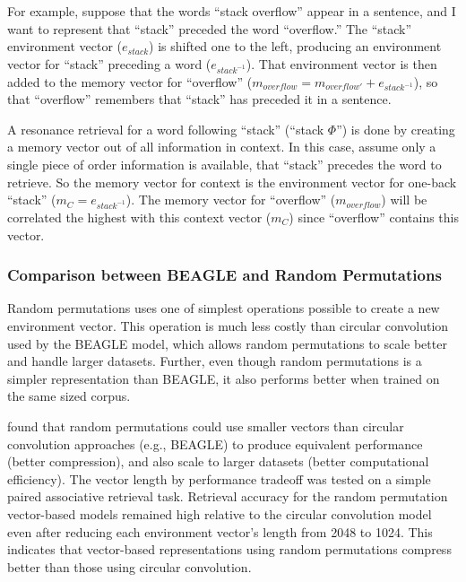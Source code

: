 \documentclass[man,floatsintext,donotrepeattitle]{apa6}
\begin{document}
For example, suppose that the words ``stack overflow'' appear in a sentence, and I want to represent that ``stack'' preceded the word ``overflow.''
The ``stack'' environment vector ($e_{stack}$) is shifted one to the left, producing an environment vector for ``stack'' preceding a word ($e_{stack^{-1}}$).
That environment vector is then added to the memory vector for ``overflow'' ($m_{overflow} = m_{overflow'} + e_{stack^{-1}}$), so that ``overflow'' remembers that ``stack'' has preceded it in a sentence.

A resonance retrieval for a word following ``stack'' (``stack $\Phi$'') is done by creating a memory vector out of all information in context.
In this case, assume only a single piece of order information is available, that ``stack'' precedes the word to retrieve.
So the memory vector for context is the environment vector for one-back ``stack'' ($m_{C} = e_{stack^{-1}}$).
The memory vector for ``overflow'' ($m_{overflow}$) will be correlated the highest with this context vector ($m_{C}$) since ``overflow'' contains this vector.

\subsubsection{Comparison between BEAGLE and Random Permutations}

Random permutations uses one of simplest operations possible to create a new environment vector.
This operation is much less costly than circular convolution used by the BEAGLE model, which allows random permutations to scale better and handle larger datasets.
Further, even though random permutations is a simpler representation than BEAGLE, it also performs better when trained on the same sized corpus. 

\textcite{Recchia2010} found that random permutations could use smaller vectors than circular convolution approaches (e.g., BEAGLE) to produce equivalent performance (better compression),
and also scale to larger datasets (better computational efficiency).
The vector length by performance tradeoff was tested on a simple paired associative retrieval task. 
Retrieval accuracy for the random permutation vector-based models remained high relative to the circular convolution model even after reducing each environment vector's length from \num{2048} to \num{1024}.
This indicates that vector-based representations using random permutations compress better than those using circular convolution.
\end{document}
